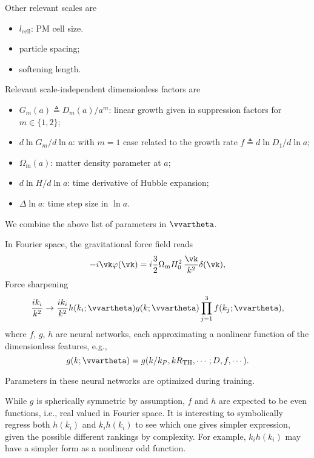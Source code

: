 \documentclass[usenatbib]{mnras}
\renewcommand{\d}{d}
\newcommand{\Omegam}{\Omega_\mathrm{m}}
\newcommand{\tophat}{\mathrm{TH}}
\newcommand{\YL}[1]{\textcolor{Bittersweet}{#1}}
\begin{document}
Other relevant scales are
\begin{itemize}
\item $l_\mathrm{cell}$: PM cell size.
\item particle spacing;
\item softening length.
\end{itemize}

Relevant scale-independent dimensionless factors are
\begin{itemize}
\item $G_m(a) \triangleq D_m(a) / a^m$: linear growth given in
  suppression factors for $m \in \{1, 2\}$;
\item $\d\ln G_m / \d\ln a$: with $m=1$ case related to the growth rate
  $f \triangleq \d\ln D_1 / \d\ln a$;
\item $\Omegam(a)$: matter density parameter at $a$;
\item $\d\ln H / \d\ln a$: time derivative of Hubble expansion;
\item $\Delta\ln a$: time step size in $\ln a$.
\end{itemize}

We combine the above list of parameters in $\vvartheta$.


In Fourier space, the gravitational force field reads
\begin{equation}
- i \vk \varphi(\vk) = i \frac32 \Omegam H_0^2 \,\frac{\vk}{k^2} \delta(\vk),
\end{equation}
Force sharpening
%
\begin{equation}
\frac{i k_i}{k^2} \to \frac{i k_i}{k^2}
  h(k_i; \vvartheta) g(k; \vvartheta) \prod_{j=1}^3 f(k_j; \vvartheta),
\end{equation}
%
where $f$, $g$, $h$ are neural networks, each approximating a nonlinear
function of the dimensionless features, e.g.,
%
\begin{equation}
g(k; \vvartheta) = g(k/k_P, kR_\tophat, \cdots; D, f, \cdots).
\end{equation}

Parameters in these neural networks are optimized during training.

\YL{While $g$ is spherically symmetric by assumption, $f$ and $h$ are
expected to be even functions, i.e., real valued in Fourier space.
It is interesting to symbolically regress both $h(k_i)$ and $k_i h(k_i)$
to see which one gives simpler expression, given the possible different
rankings by complexity.
For example, $k_i h(k_i)$ may have a simpler form as a nonlinear odd
function.}
\end{document}
